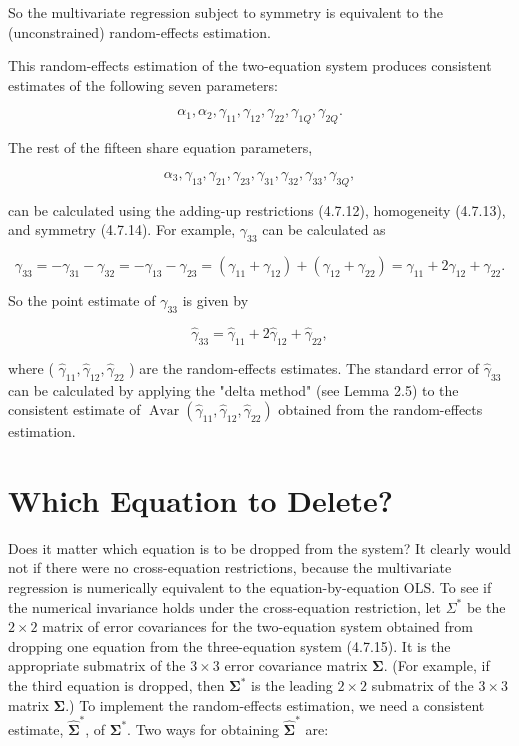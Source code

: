 \documentclass[10pt]{article}
\begin{document}
So the multivariate regression subject to symmetry is equivalent to the (unconstrained) random-effects estimation.

This random-effects estimation of the two-equation system produces consistent estimates of the following seven parameters:

$$
\alpha_{1}, \alpha_{2}, \gamma_{11}, \gamma_{12}, \gamma_{22}, \gamma_{1 Q}, \gamma_{2 Q} .
$$

The rest of the fifteen share equation parameters,

$$
\alpha_{3}, \gamma_{13}, \gamma_{21}, \gamma_{23}, \gamma_{31}, \gamma_{32}, \gamma_{33}, \gamma_{3 Q},
$$

can be calculated using the adding-up restrictions (4.7.12), homogeneity (4.7.13), and symmetry (4.7.14). For example, $\gamma_{33}$ can be calculated as

$$
\gamma_{33}=-\gamma_{31}-\gamma_{32}=-\gamma_{13}-\gamma_{23}=\left(\gamma_{11}+\gamma_{12}\right)+\left(\gamma_{12}+\gamma_{22}\right)=\gamma_{11}+2 \gamma_{12}+\gamma_{22} .
$$

So the point estimate of $\gamma_{33}$ is given by

$$
\hat{\gamma}_{33}=\hat{\gamma}_{11}+2 \hat{\gamma}_{12}+\hat{\gamma}_{22},
$$

where ( $\hat{\gamma}_{11}, \hat{\gamma}_{12}, \hat{\gamma}_{22}$ ) are the random-effects estimates. The standard error of $\hat{\gamma}_{33}$ can be calculated by applying the "delta method" (see Lemma 2.5) to the consistent estimate of $\operatorname{Avar}\left(\hat{\gamma}_{11}, \hat{\gamma}_{12}, \hat{\gamma}_{22}\right)$ obtained from the random-effects estimation.

\section*{Which Equation to Delete?}
Does it matter which equation is to be dropped from the system? It clearly would not if there were no cross-equation restrictions, because the multivariate regression is numerically equivalent to the equation-by-equation OLS. To see if the numerical invariance holds under the cross-equation restriction, let $\Sigma^{*}$ be the $2 \times 2$ matrix of error covariances for the two-equation system obtained from dropping one equation from the three-equation system (4.7.15). It is the appropriate submatrix of the $3 \times 3$ error covariance matrix $\mathbf{\Sigma}$. (For example, if the third equation is dropped, then $\boldsymbol{\Sigma}^{*}$ is the leading $2 \times 2$ submatrix of the $3 \times 3$ matrix $\boldsymbol{\Sigma}$.) To implement the random-effects estimation, we need a consistent estimate, $\widehat{\boldsymbol{\Sigma}}^{*}$, of $\boldsymbol{\Sigma}^{*}$. Two ways for obtaining $\widehat{\mathbf{\Sigma}}^{*}$ are:
\end{document}
